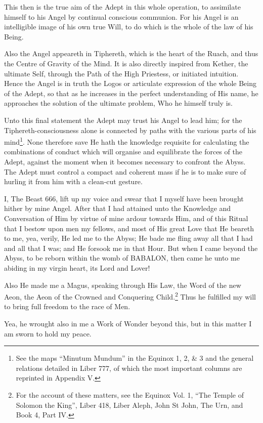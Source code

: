 This then is the true aim of the Adept in this whole operation, to assimilate himself to his Angel by continual conscious communion. For his Angel is an intelligible image of his own true Will, to do which is the whole of the law of his Being.

Also the Angel appeareth in Tiphereth, which is the heart of the Ruach, and thus the Centre of Gravity of the Mind. It is also directly inspired from Kether, the ultimate Self, through the Path of the High Priestess, or initiated intuition. Hence the Angel is in truth the Logos or articulate expression of the whole Being of the Adept, so that as he increases in the perfect understanding of His name, he approaches the solution of the ultimate problem, Who he himself truly is.

Unto this final statement the Adept may trust his Angel to lead him; for the Tiphereth-consciousness alone is connected by paths with the various parts of his mind\footnote{See the maps \enquote{Minutum Mundum} in the Equinox 1, 2, \& 3 and the general relations detailed in Liber 777, of which the most important columns are reprinted in Appendix V.}. None therefore save He hath the knowledge requisite for calculating the combinations of conduct which will organise and equilibrate the forces of the Adept, against the moment when it becomes necessary to confront the Abyss. The Adept must control a compact and coherent mass if he is to make sure of hurling it from him with a clean-cut gesture.

I, The Beast 666, lift up my voice and swear that I myself have been brought hither by mine Angel. After that I had attained unto the Knowledge and Conversation of Him by virtue of mine ardour towards Him, and of this Ritual that I bestow upon men my fellows, and most of His great Love that He beareth to me, yea, verily, He led me to the Abyss; He bade me fling away all that I had and all that I was; and He forsook me in that Hour. But when I came beyond the Abyss, to be reborn within the womb of BABALON, then came he unto me abiding in my virgin heart, its Lord and Lover!

Also He made me a Magus, speaking through His Law, the Word of the new Aeon, the Aeon of the Crowned and Conquering Child.\footnote{For the account of these matters, see the Equinox Vol. 1, \enquote{The Temple of Solomon the King}, Liber 418, Liber Aleph, John St John, The Urn, and Book 4, Part IV.} Thus he fulfilled my will to bring full freedom to the race of Men.

Yea, he wrought also in me a Work of Wonder beyond this, but in this matter I am sworn to hold my peace.


